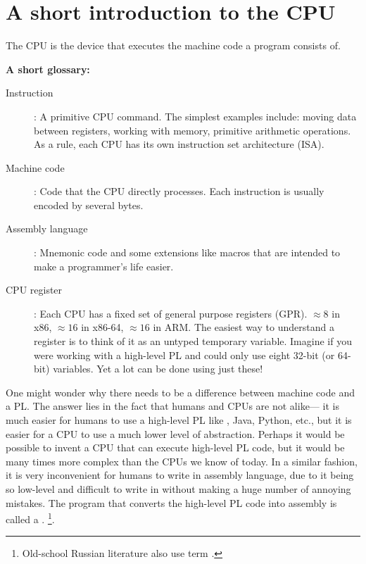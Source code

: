 \ifdefined\ENGLISH

\chapter{A short introduction to the CPU}

The \ac{CPU} is the device that executes the machine code a program consists of.

\textbf{A short glossary:}

\begin{description}
\item[Instruction]: A primitive \ac{CPU} command.
The simplest examples include: moving data between registers, working with memory, primitive arithmetic operations.
As a rule, each \ac{CPU} has its own instruction set architecture (\ac{ISA}).

\item[Machine code]: Code that the \ac{CPU} directly processes. 
Each instruction is usually encoded by several bytes.
\item[Assembly language]: Mnemonic code and some extensions like macros that are intended to make a programmer's life easier.
\item[CPU register]: Each \ac{CPU} has a fixed set of general purpose registers (\ac{GPR}).
$\approx 8$ in x86, $\approx 16$ in x86-64, $\approx 16$ in ARM.
The easiest way to understand a register is to think of it as an untyped temporary variable.
Imagine if you were working with a high-level \ac{PL} and could only use eight 32-bit (or 64-bit) variables.
Yet a lot can be done using just these!
\end{description}


One might wonder why there needs to be a difference between machine code and a \ac{PL}.  The answer lies in the fact that humans and \ac{CPU}s are not alike---%
it is much easier for humans to use a high-level \ac{PL} like \CCpp, Java, Python, etc., but it is easier for a \ac{CPU} to use a much lower level of abstraction.
Perhaps it would be possible to invent a \ac{CPU} that can execute high-level \ac{PL} code, but it would be many times more complex than the \ac{CPU}s we know of today.
In a similar fashion, it is very inconvenient for humans to write in assembly language, due to it being so low-level and difficult to write in without making a huge number of annoying mistakes.
The program that converts the high-level \ac{PL} code into assembly is called a .
\footnote{Old-school Russian literature also use term .}.

